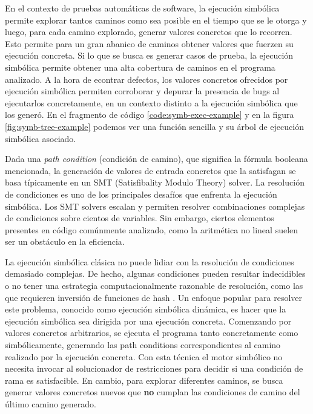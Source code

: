 En el contexto de pruebas automáticas de software, la ejecución simbólica permite explorar tantos caminos como sea posible en el tiempo que se le otorga y luego, para cada camino explorado, generar valores concretos que lo recorren.
Esto permite para un gran abanico de caminos obtener valores que fuerzen su ejecución concreta.
Si lo que se busca es generar casos de prueba, la ejecución simbólica permite obtener una alta cobertura de caminos en el programa analizado.
A la hora de econtrar defectos, los valores concretos ofrecidos por ejecución simbólica permiten corroborar y depurar la presencia de bugs al ejecutarlos concretamente, en un contexto distinto a la ejecución simbólica que los generó.
En el fragmento de código \ref{code:symb-exec-example} y en la figura \ref{fig:symb-tree-example} podemos ver una función sencilla y su árbol de ejecución simbólica asociado.

Dada una \textit{path condition} (condición de camino), que significa la fórmula booleana mencionada, la generación de valores de entrada concretos que la satisfagan se basa típicamente en un SMT (Satisfibality Modulo Theory) solver.
La resolución de condiciones es uno de los principales desafíos que enfrenta la ejecución simbólica.
Los SMT solvers escalan y permiten resolver combinaciones complejas de condiciones sobre cientos de variables.
Sin embargo, ciertos elementos presentes en código comúnmente analizado, como la aritmética no lineal suelen ser un obstáculo en la eficiencia.

La ejecución simbólica clásica no puede lidiar con la resolución de condiciones demasiado complejas.
De hecho, algunas condiciones pueden resultar indecidibles o no tener una estrategia computacionalmente razonable de resolución, como las que requieren inversión de funciones de hash \cite{manticore}.
Un enfoque popular para resolver este problema, conocido como ejecución simbólica dinámica, es hacer que la ejecución simbólica sea dirigida por una ejecución concreta.
Comenzando por valores concretos arbitrarios, se ejecuta el programa tanto concretamente como simbólicamente, generando las path conditions correspondientes al camino realizado por la ejecución concreta.
Con esta técnica el motor simbólico no necesita invocar al solucionador de restricciones para decidir si una condición de rama es satisfacible.
En cambio, para explorar diferentes caminos, se busca generar valores concretos nuevos que \textbf{no} cumplan las condiciones de camino del último camino generado.

